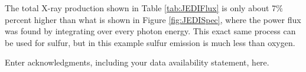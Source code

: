 \documentclass[draft]{agujournal2018}
\begin{document}
The total X-ray production shown in Table \ref{tab:JEDIFlux} is only about 7$\%$ percent higher than what is shown in Figure \ref{fig:JEDISpec}, where the power flux was found by integrating over every photon energy.
This exact same process can be used for sulfur, but in this example sulfur emission is much less than oxygen.

%
%
%
%
%
%
%
%


\acknowledgments
Enter acknowledgments, including your data availability statement, here.





\appendix


\end{document}
